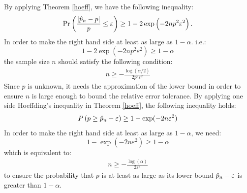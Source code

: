 \documentclass{iitthesis}
\begin{document}
By applying Theorem \ref{hoeff}, we have the following inequality:
\begin{align*}
\Pr\left(\frac{|\hat{p}_n-p|}{p} \leq \varepsilon\right) \geq 1-2\exp\left(-2np^2\varepsilon^2\right).
\end{align*}
In order to make the right hand side at least as large as $1-\alpha$. i.e.:
$$1-2\exp\left(-2np^2\varepsilon^2\right) \geq 1-\alpha$$
the sample size $n$ should satisfy the following condition: 
\begin{align*}
n \geq -\frac{\log (\alpha/2)}{2 p^2 \varepsilon^2}
\end{align*}
Since $p$ is unknown, it needs the approximation of the lower bound in order to ensure $n$ is large enough to bound the relative error tolerance.
By applying one side Hoeffding's inequality in Theorem \ref{hoeff}, the following inequality holds:
\begin{align}\label{onesidehoeffn}
P\left(p \geq \hat{p}_n-\varepsilon \right) \geq 1- \exp(-2n\varepsilon^2)
\end{align}
In order to make the right hand side at least as large as $1-\alpha$, we need:
$$1- \exp(-2n\varepsilon^2) \geq 1-\alpha$$
which is equivalent to: 
\begin{align*}
n \geq -\frac{\log(\alpha)} {2\varepsilon^2 }
 \end{align*}
to ensure the probability that $p$  is at least as large as its lower bound $\hat{p}_n-\varepsilon$ is greater than $1-\alpha$.
\end{document}
